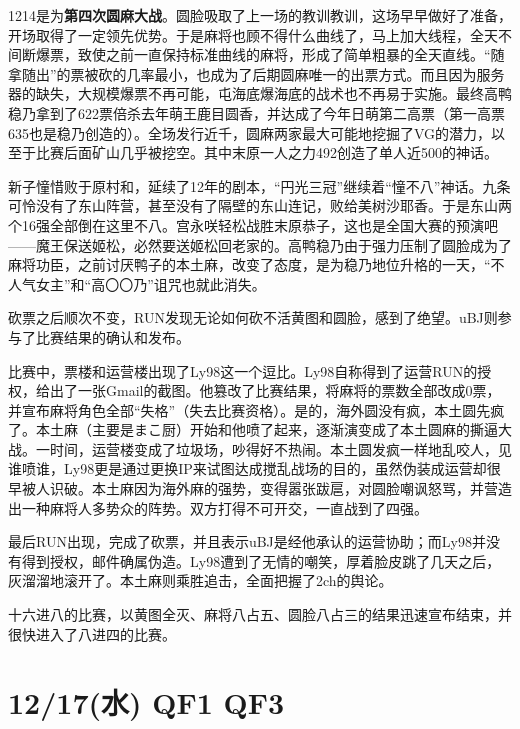 
1214是为\textbf{第四次圆麻大战}。圆脸吸取了上一场的教训教训，这场早早做好了准备，开场取得了一定领先优势。于是麻将也顾不得什么曲线了，马上加大线程，全天不间断爆票，致使之前一直保持标准曲线的麻将，形成了简单粗暴的全天直线。“随拿随出”的票被砍的几率最小，也成为了后期圆麻唯一的出票方式。而且因为服务器的缺失，大规模爆票不再可能，屯海底爆海底的战术也不再易于实施。最终高鸭稳乃拿到了622票倍杀去年萌王鹿目圆香，并达成了今年日萌第二高票（第一高票635也是稳乃创造的）。全场发行近千，圆麻两家最大可能地挖掘了VG的潜力，以至于比赛后面矿山几乎被挖空。其中末原一人之力492创造了单人近500的神话。

新子憧惜败于原村和，延续了12年的剧本，“円光三冠”继续着“憧不八”神话。九条可怜没有了东山阵营，甚至没有了隔壁的东山连记，败给美树沙耶香。于是东山两个16强全部倒在这里不八。宫永咲轻松战胜末原恭子，这也是全国大赛的预演吧——魔王保送姬松，必然要送姬松回老家的。高鸭稳乃由于强力压制了圆脸成为了麻将功臣，之前讨厌鸭子的本土麻，改变了态度，是为稳乃地位升格的一天，“不人气女主”和“高〇〇乃”诅咒也就此消失。

砍票之后顺次不变，RUN发现无论如何砍不活黄图和圆脸，感到了绝望。uBJ则参与了比赛结果的确认和发布。

比赛中，票楼和运营楼出现了Ly98这一个逗比。Ly98自称得到了运营RUN的授权，给出了一张Gmail的截图。他篡改了比赛结果，将麻将的票数全部改成0票，并宣布麻将角色全部“失格”（失去比赛资格）。是的，海外圆没有疯，本土圆先疯了。本土麻（主要是まこ厨）开始和他喷了起来，逐渐演变成了本土圆麻的撕逼大战。一时间，运营楼变成了垃圾场，吵得好不热闹。本土圆发疯一样地乱咬人，见谁喷谁，Ly98更是通过更换IP来试图达成搅乱战场的目的，虽然伪装成运营却很早被人识破。本土麻因为海外麻的强势，变得嚣张跋扈，对圆脸嘲讽怒骂，并营造出一种麻将人多势众的阵势。双方打得不可开交，一直战到了四强。

最后RUN出现，完成了砍票，并且表示uBJ是经他承认的运营协助；而Ly98并没有得到授权，邮件确属伪造。Ly98遭到了无情的嘲笑，厚着脸皮跳了几天之后，灰溜溜地滚开了。本土麻则乘胜追击，全面把握了2ch的舆论。

十六进八的比赛，以黄图全灭、麻将八占五、圆脸八占三的结果迅速宣布结束，并很快进入了八进四的比赛。

\section{12/17(水) QF1 QF3}



